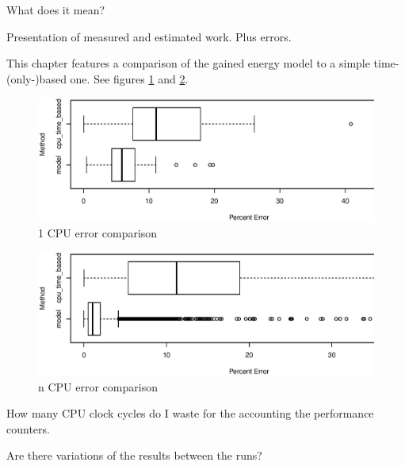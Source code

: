 \label{sec:evaluation}

What does it mean?



\label{sec:error}

Presentation of measured and estimated work. Plus errors.


\label{sec:time-based}

This chapter features a comparison of the gained energy model to a simple
time-(only-)based one. See figures \ref{fig:errs-1cpu} and \ref{fig:errs-ncpu}.

\begin{figure}
  \centering
    \includegraphics[width=\textwidth]{fig/1cpu-bench-errs.eps}
  \caption{1 CPU error comparison}
  \label{fig:errs-1cpu}
\end{figure}

\begin{figure}
  \centering
    \includegraphics[width=\textwidth]{fig/Ncpu-bench-errs.eps}
  \caption{n CPU error comparison}
  \label{fig:errs-ncpu}
\end{figure}



\label{sec:overhead}

How many CPU clock cycles do I waste for the accounting the performance
counters.


\label{sec:variation}

Are there variations of the results between the runs?
